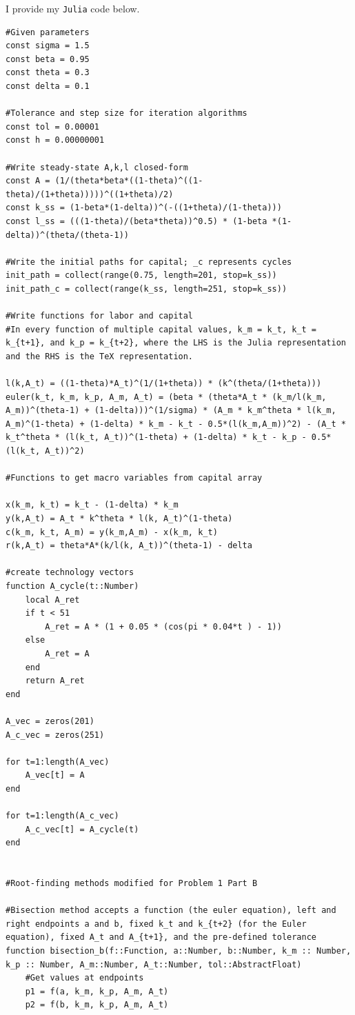 \documentclass[12pt, letterpaper, parskip = full]{article}
\begin{document}
\newpage

\appendix

I provide my \texttt{Julia} code below.

\begin{lstlisting}[breaklines]
#Given parameters
const sigma = 1.5
const beta = 0.95
const theta = 0.3
const delta = 0.1

#Tolerance and step size for iteration algorithms
const tol = 0.00001
const h = 0.00000001

#Write steady-state A,k,l closed-form
const A = (1/(theta*beta*((1-theta)^((1-theta)/(1+theta)))))^((1+theta)/2)
const k_ss = (1-beta*(1-delta))^(-((1+theta)/(1-theta)))
const l_ss = (((1-theta)/(beta*theta))^0.5) * (1-beta *(1-delta))^(theta/(theta-1))

#Write the initial paths for capital; _c represents cycles
init_path = collect(range(0.75, length=201, stop=k_ss))
init_path_c = collect(range(k_ss, length=251, stop=k_ss))

#Write functions for labor and capital
#In every function of multiple capital values, k_m = k_t, k_t = k_{t+1}, and k_p = k_{t+2}, where the LHS is the Julia representation and the RHS is the TeX representation.

l(k,A_t) = ((1-theta)*A_t)^(1/(1+theta)) * (k^(theta/(1+theta)))
euler(k_t, k_m, k_p, A_m, A_t) = (beta * (theta*A_t * (k_m/l(k_m, A_m))^(theta-1) + (1-delta)))^(1/sigma) * (A_m * k_m^theta * l(k_m, A_m)^(1-theta) + (1-delta) * k_m - k_t - 0.5*(l(k_m,A_m))^2) - (A_t * k_t^theta * (l(k_t, A_t))^(1-theta) + (1-delta) * k_t - k_p - 0.5*(l(k_t, A_t))^2)

#Functions to get macro variables from capital array

x(k_m, k_t) = k_t - (1-delta) * k_m
y(k,A_t) = A_t * k^theta * l(k, A_t)^(1-theta)
c(k_m, k_t, A_m) = y(k_m,A_m) - x(k_m, k_t)
r(k,A_t) = theta*A*(k/l(k, A_t))^(theta-1) - delta

#create technology vectors
function A_cycle(t::Number)
    local A_ret
    if t < 51
        A_ret = A * (1 + 0.05 * (cos(pi * 0.04*t ) - 1))
    else
        A_ret = A
    end
    return A_ret
end

A_vec = zeros(201)
A_c_vec = zeros(251)

for t=1:length(A_vec)
    A_vec[t] = A
end

for t=1:length(A_c_vec)
    A_c_vec[t] = A_cycle(t)
end


#Root-finding methods modified for Problem 1 Part B

#Bisection method accepts a function (the euler equation), left and right endpoints a and b, fixed k_t and k_{t+2} (for the Euler equation), fixed A_t and A_{t+1}, and the pre-defined tolerance
function bisection_b(f::Function, a::Number, b::Number, k_m :: Number, k_p :: Number, A_m::Number, A_t::Number, tol::AbstractFloat)
    #Get values at endpoints
    p1 = f(a, k_m, k_p, A_m, A_t)
    p2 = f(b, k_m, k_p, A_m, A_t)


\end{lstlisting}
\end{document}
